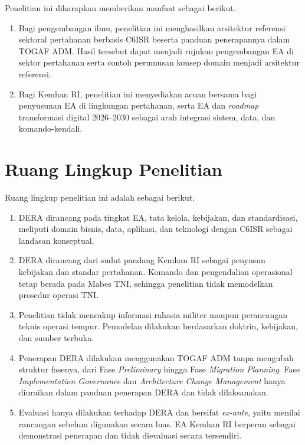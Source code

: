 Penelitian ini diharapkan memberikan manfaat sebagai berikut.

\begin{enumerate}[label=\arabic*.]
\item Bagi pengembangan ilmu, penelitian ini menghasilkan arsitektur referensi sektoral pertahanan berbasis C6ISR beserta panduan penerapannya dalam TOGAF ADM. Hasil tersebut dapat menjadi rujukan pengembangan EA di sektor pertahanan serta contoh perumusan konsep domain menjadi arsitektur referensi.
\item Bagi Kemhan RI, penelitian ini menyediakan acuan bersama bagi penyusunan EA di lingkungan pertahanan, serta EA dan \textit{roadmap} transformasi digital 2026–2030 sebagai arah integrasi sistem, data, dan komando-kendali.
\end{enumerate}

\section{Ruang Lingkup Penelitian}
\label{sec:I.5}

Ruang lingkup penelitian ini adalah sebagai berikut.

\begin{enumerate}[label=\arabic*.]
\item DERA dirancang pada tingkat EA, tata kelola, kebijakan, dan standardisasi, meliputi domain bisnis, data, aplikasi, dan teknologi dengan C6ISR sebagai landasan konseptual.
\item DERA dirancang dari sudut pandang Kemhan RI sebagai penyusun kebijakan dan standar pertahanan. Komando dan pengendalian operasional tetap berada pada Mabes TNI, sehingga penelitian tidak memodelkan prosedur operasi TNI.
\item Penelitian tidak mencakup informasi rahasia militer maupun perancangan teknis operasi tempur. Pemodelan dilakukan berdasarkan doktrin, kebijakan, dan sumber terbuka.
\item Penerapan DERA dilakukan menggunakan TOGAF ADM tanpa mengubah struktur fasenya, dari Fase \textit{Preliminary} hingga Fase \textit{Migration Planning}. Fase \textit{Implementation Governance} dan \textit{Architecture Change Management} hanya diuraikan dalam panduan penerapan DERA dan tidak dilaksanakan.
\item Evaluasi hanya dilakukan terhadap DERA dan bersifat \textit{ex-ante}, yaitu menilai rancangan sebelum digunakan secara luas. EA Kemhan RI berperan sebagai demonstrasi penerapan dan tidak dievaluasi secara tersendiri.
\end{enumerate}

